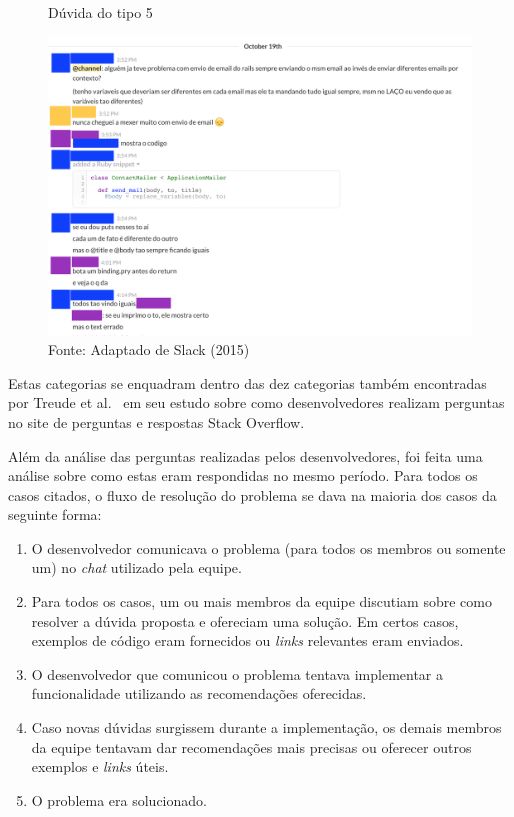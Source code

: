 \begin{figure}[h]
	\centering
    \caption{Dúvida do tipo 5}
    \includegraphics[width=15cm]{Imagens/c-type-5-2-1.png}
	\caption*{Fonte: Adaptado de Slack (2015)}
\end{figure}

Estas categorias se enquadram dentro das dez categorias também encontradas por Treude et al.~\cite{Treude2011} em seu estudo sobre como desenvolvedores realizam perguntas no site de perguntas e respostas Stack Overflow.

Além da análise das perguntas realizadas pelos desenvolvedores, foi feita uma análise sobre como estas eram respondidas no mesmo período. Para todos os casos citados, o fluxo de resolução do problema se dava na maioria dos casos da seguinte forma:

\begin{enumerate}[i]
  \item O desenvolvedor comunicava o problema (para todos os membros ou somente um) no \textit{chat} utilizado pela equipe.
  \item Para todos os casos, um ou mais membros da equipe discutiam sobre como resolver a dúvida proposta e ofereciam uma solução. Em certos casos, exemplos de código eram fornecidos ou \textit{links} relevantes eram enviados.
  \item O desenvolvedor que comunicou o problema tentava implementar a funcionalidade utilizando as recomendações oferecidas.
  \item Caso novas dúvidas surgissem durante a implementação, os demais membros da equipe tentavam dar recomendações mais precisas ou oferecer outros exemplos e \textit{links} úteis.
  \item O problema era solucionado.
\end{enumerate}

